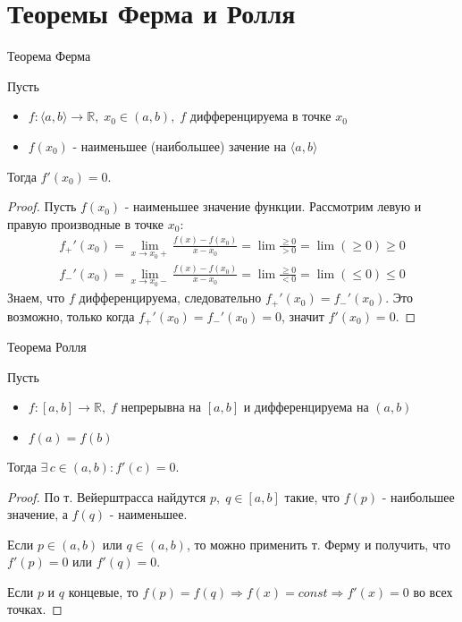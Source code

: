 \section{Теоремы Ферма и Ролля}
\begin{theorem-non}
    Теорема Ферма

    Пусть
    \begin{itemize}
        \item $f: \langle a, b \rangle \to \mathbb{R}, \; x_0 \in (a, b), \; f$ дифференцируема в точке $x_0$
        \item $f(x_0)$ - наименьшее (наибольшее) зачение на $\langle a, b \rangle$
    \end{itemize}
    Тогда $f'(x_0) = 0$.
\end{theorem-non}
\begin{proof}
    Пусть $f(x_0)$ - наименьшее значение функции. Рассмотрим левую и правую производные в точке $x_0$:
    \begin{gather*}
        f_+'(x_0) = \lim_{x \to x_0+} \frac{f(x) - f(x_0)}{x - x_0} = \lim \frac{\geqslant 0}{> 0} = \lim (\geqslant 0) \geqslant 0 \\
        f_-'(x_0) = \lim_{x \to x_0-} \frac{f(x) - f(x_0)}{x - x_0} = \lim \frac{\geqslant 0}{< 0} = \lim (\leqslant 0) \leqslant 0 
    \end{gather*}   
    Знаем, что $f$ дифференцируема, следовательно $f_+'(x_0) = f_-'(x_0)$. Это возможно, только когда $f_+'(x_0) = f_-'(x_0) = 0$, значит $f'(x_0) = 0$.
\end{proof}

\begin{theorem-non}
    Теорема Ролля

    Пусть 
    \begin{itemize}
        \item $f: [a, b] \to \mathbb{R}, \; f$ непрерывна на $[a, b]$ и дифференцируема на $(a, b)$
        \item $f(a) = f(b)$
    \end{itemize}
    Тогда $\exists \, c \in (a, b) : f'(c) = 0$.
\end{theorem-non}
\begin{proof}
    По т. Вейерштрасса найдутся $p, \; q \in [a, b]$ такие, что $f(p)$ - наибольшее значение, а $f(q)$ - наименьшее.
    
    Если $p \in (a, b)$ или $q \in (a, b)$, то можно применить т. Ферму и получить, что $f'(p) = 0$ или $f'(q) = 0$.

    Если $p$ и $q$ концевые, то $f(p) = f(q) \Rightarrow f(x) = const \Rightarrow f'(x) = 0$ во всех точках.
\end{proof}